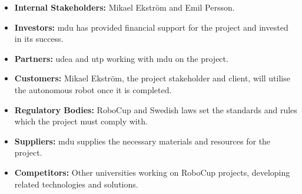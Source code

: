 \begin{itemize}
    \item \textbf{Internal Stakeholders:} Mikael Ekström and Emil Persson.
    \item \textbf{Investors:} \ac{mdu} has provided financial support for the project and invested in its success. 
    \item \textbf{Partners:} \ac{udea} and \ac{utp} working with \ac{mdu} on the project.
    \item \textbf{Customers:} Mikael Ekström, the project stakeholder and client, will utilise the autonomous robot once it is completed. 
    \item \textbf{Regulatory Bodies:} RoboCup and Swedish laws set the standards and rules which the project must comply with. 
    \item \textbf{Suppliers:} \ac{mdu} supplies the necessary materials and resources for the project. 
    \item \textbf{Competitors:} Other universities working on RoboCup projects, developing related technologies and solutions. 
\end{itemize}


